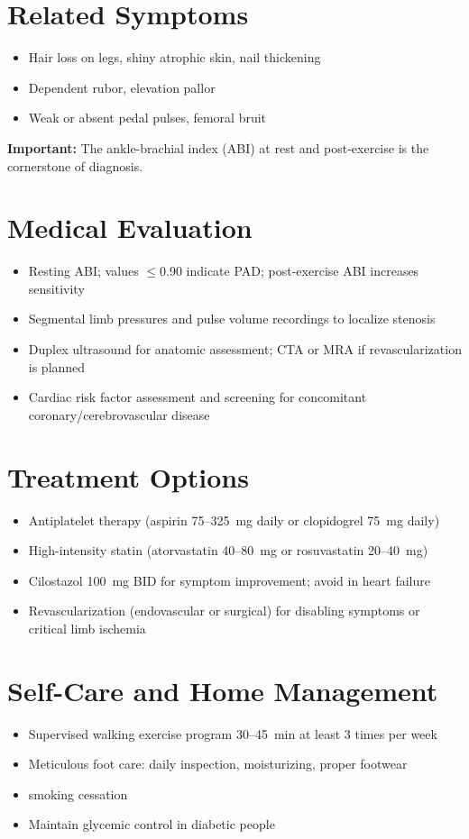 \section*{Related Symptoms}
\begin{itemize}
  \item Hair loss on legs, shiny atrophic skin, nail thickening
  \item Dependent rubor, elevation pallor
  \item Weak or absent pedal pulses, femoral bruit
\end{itemize}
\textbf{Important:} The ankle-brachial index (ABI) at rest and post-exercise is the cornerstone of diagnosis.

\section*{Medical Evaluation}
\begin{itemize}
  \item Resting ABI; values $\leq$0.90 indicate PAD; post-exercise ABI increases sensitivity
  \item Segmental limb pressures and pulse volume recordings to localize stenosis
  \item Duplex ultrasound for anatomic assessment; CTA or MRA if revascularization is planned
  \item Cardiac risk factor assessment and screening for concomitant coronary/cerebrovascular disease
\end{itemize}

\section*{Treatment Options}
\begin{itemize}
  \item Antiplatelet therapy (aspirin 75--325~mg daily or clopidogrel 75~mg daily)
  \item High-intensity statin (atorvastatin 40--80~mg or rosuvastatin 20--40~mg)
  \item Cilostazol 100~mg BID for symptom improvement; avoid in heart failure
  \item Revascularization (endovascular or surgical) for disabling symptoms or critical limb ischemia
\end{itemize}

\section*{Self-Care and Home Management}
\begin{itemize}
  \item Supervised walking exercise program 30--45~min at least 3 times per week
  \item Meticulous foot care: daily inspection, moisturizing, proper footwear
  \item smoking cessation
  \item Maintain glycemic control in diabetic people
\end{itemize}

